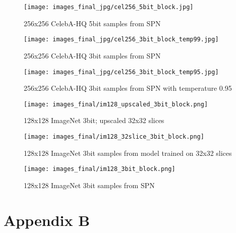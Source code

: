 \documentclass{article} \usepackage{iclr2019_conference,times}
\begin{document}
\begin{figure}[h]
  \begin{center}
    \texttt{[image: images\_final\_jpg/cel256\_5bit\_block.jpg]}
    \caption{256x256 CelebA-HQ 5bit samples from SPN}
    \label{fig:cel256_5bit}
  \end{center}
\end{figure}

\begin{figure}[h]
  \begin{center}
    \texttt{[image: images\_final\_jpg/cel256\_3bit\_block\_temp99.jpg]}
    \caption{256x256 CelebA-HQ 3bit samples from SPN}
    \label{fig:cel256_3bit}
  \end{center}
\end{figure}

\begin{figure}[h]
  \begin{center}
    \texttt{[image: images\_final\_jpg/cel256\_3bit\_block\_temp95.jpg]}
    \caption{256x256 CelebA-HQ 3bit samples from SPN with temperature 0.95}
    \label{fig:cel256_3bit_temp95}
  \end{center}
\end{figure}

\begin{figure}[h]
  \begin{center}
    \texttt{[image: images\_final/im128\_upscaled\_3bit\_block.png]}
    \caption{128x128 ImageNet 3bit; upscaled 32x32 slices}
    \label{fig:im128_upscaled_3bit}
  \end{center}
\end{figure}

\begin{figure}[h]
  \begin{center}
    \texttt{[image: images\_final/im128\_32slice\_3bit\_block.png]}
    \caption{128x128 ImageNet 3bit samples from model trained on 32x32 slices}
    \label{fig:im128_32slice_3bit}
  \end{center}
\end{figure}

\begin{figure}[h]
  \begin{center}
    \texttt{[image: images\_final/im128\_3bit\_block.png]}
    \caption{128x128 ImageNet 3bit samples from SPN}
    \label{fig:im128_3bit}
  \end{center}
\end{figure}

\section*{Appendix B}
\end{document}
